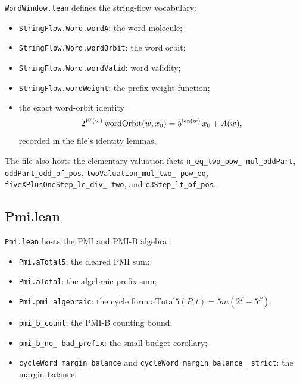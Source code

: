 \texttt{WordWindow.lean} defines the string-flow vocabulary:
\begin{itemize}[leftmargin=*]
\item \texttt{StringFlow.Word.wordA}: the word molecule;
\item \texttt{StringFlow.Word.wordOrbit}: the word orbit;
\item \texttt{StringFlow.Word.wordValid}: word validity;
\item \texttt{StringFlow.wordWeight}: the prefix-weight function;
\item the exact word-orbit identity
  \begin{equation*}
    2^{W(w)}\,\mathrm{wordOrbit}(w,x_0)
      =5^{\operatorname{len}(w)}\,x_0+A(w),
  \end{equation*}
  recorded in the file's identity lemmas.
\end{itemize}
The file also hosts the elementary valuation facts
\texttt{n\_\allowbreak eq\_\allowbreak two\_\allowbreak pow\_\allowbreak
mul\_\allowbreak oddPart},
\texttt{oddPart\_\allowbreak odd\_\allowbreak of\_\allowbreak pos},
\texttt{twoValuation\_\allowbreak mul\_\allowbreak two\_\allowbreak
pow\_\allowbreak eq},
\texttt{fiveXPlusOneStep\_\allowbreak le\_\allowbreak div\_\allowbreak
two}, and
\texttt{c3Step\_\allowbreak lt\_\allowbreak of\_\allowbreak pos}.

\subsection{Pmi.lean}

\texttt{Pmi.lean} hosts the PMI and PMI-B algebra:
\begin{itemize}[leftmargin=*]
\item \texttt{Pmi.aTotal5}: the cleared PMI sum;
\item \texttt{Pmi.aTotal}: the algebraic prefix sum;
\item \texttt{Pmi.pmi\_\allowbreak algebraic}: the cycle form
  $\mathrm{aTotal5}(P,t)=5m(2^T-5^P)$;
\item \texttt{pmi\_\allowbreak b\_\allowbreak count}: the PMI-B
  counting bound;
\item \texttt{pmi\_\allowbreak b\_\allowbreak no\_\allowbreak
  bad\_\allowbreak prefix}: the small-budget corollary;
\item \texttt{cycleWord\_\allowbreak margin\_\allowbreak balance} and
  \texttt{cycleWord\_\allowbreak margin\_\allowbreak balance\_\allowbreak
  strict}: the margin balance.
\end{itemize}

